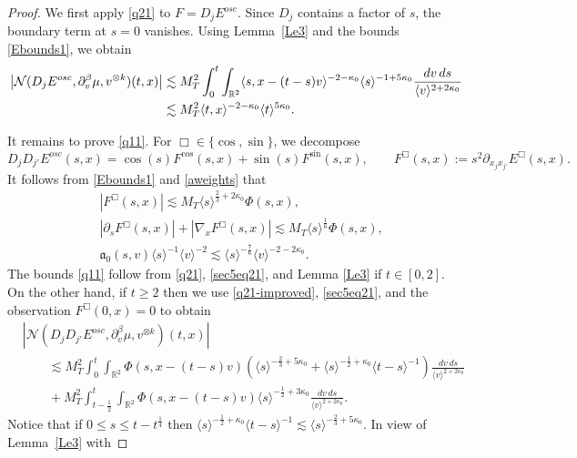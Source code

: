 \documentclass[reqno,11pt]{amsart}
\numberwithin{equation}{section}
\begin{document}
	
\begin{proof} We first apply \eqref{q21} to
	$F=D_jE^{osc}$. Since $D_j$ contains a factor of $s$, the
	boundary term at $s=0$ vanishes. Using Lemma~\ref{Le3} and the bounds \eqref{Ebounds1}, we obtain
		\begin{align*}
		\left|
		\mathcal N(D_jE^{osc},\partial_v^\beta\mu,v^{\otimes k})(t,x)
		\right|
		&\lesssim
		M_T^2
		\int_0^t\int_{\mathbb R^2}
		\langle s,x-(t-s)v\rangle^{-2-\kappa_0}
		\langle s\rangle^{-1+5\kappa_0}
		\frac{dv\,ds}{\langle v\rangle^{2+2\kappa_0}}
		\notag\\
		&\lesssim
		M_T^2
		\langle t,x\rangle^{-2-\kappa_0}
		\langle t\rangle^{5\kappa_0}.
	\end{align*}

It remains to prove \eqref{q11}. For $\Box\in\{\cos,\sin\}$, we decompose
\[
	D_jD_{j'}E^{osc}(s,x)=
	\cos(s)F^{\cos}(s,x)+\sin(s)F^{\sin}(s,x),\qquad 	F^\Box(s,x):=s^2\partial_{x_jx_{j'}}E^\Box(s,x).
\]
It follows from \eqref{Ebounds1} and \eqref{aweights} that
\begin{equation}\label{sec5eq21}
\begin{split}
	&|F^\Box(s,x)|\lesssim M_T\langle s\rangle^{\frac23+2\kappa_0}\Phi(s,x),\\
	&|\partial_sF^\Box(s,x)|+|\nabla_xF^\Box(s,x)|\lesssim M_T\langle s\rangle^{\frac16}\Phi(s,x),\\
	&\mathfrak a_0(s,v)\langle s\rangle^{-1}\langle v\rangle^{-2}\lesssim\langle s\rangle^{-\frac76}\langle v\rangle^{-2-2\kappa_0}.
\end{split}
\end{equation}
The bounds \eqref{q11} follow from \eqref{q21},  \eqref{sec5eq21}, and Lemma \ref{Le3} if $t\in[0,2]$. On the other hand, if $t\geq 2$ then we use \eqref{q21-improved}, \eqref{sec5eq21}, and the observation $F^\Box(0,x)=0$ to obtain
\begin{align*}
&\left|
\mathcal N(D_jD_{j'}E^{osc},
\partial_v^\beta\mu,v^{\otimes k})(t,x)
\right|\\
&\qquad\lesssim
M_T^2\int_0^t\int_{\mathbb R^2}
\Phi(s,x-(t-s)v)
\left(\langle s\rangle^{-\frac23+5\kappa_0}+
\langle s\rangle^{-\frac12+\kappa_0}
\langle t-s\rangle^{-1}\right)
\frac{dv\,ds}{\langle v\rangle^{2+2\kappa_0}}\\
&\qquad+
M_T^2\int_{t-\frac12}^t\int_{\mathbb R^2}
\Phi(s,x-(t-s)v)\langle s\rangle^{-\frac12+3\kappa_0}
\frac{dv\,ds}{\langle v\rangle^{2+2\kappa_0}}.
\end{align*}
Notice that if $0\leq s\leq t-t^{\frac14}$ then $\langle s\rangle^{-\frac12+\kappa_0}\langle t-s\rangle^{-1}\lesssim\langle s\rangle^{-\frac23+5\kappa_0}$. In view of Lemma~\ref{Le3} with

\end{proof}
\end{document}
